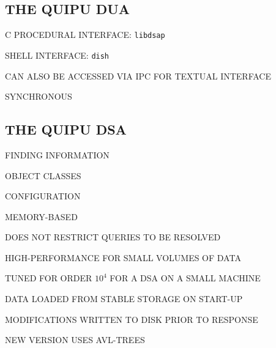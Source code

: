 \begin{bwslide}
\part*	{THE QUIPU DUA}\bf

\begin{nrtc}
\item	C PROCEDURAL INTERFACE: \verb"libdsap"

\item	SHELL INTERFACE: \verb"dish"
    \begin{nrtc}
    \item	CAN ALSO BE ACCESSED VIA IPC FOR TEXTUAL INTERFACE
    \end{nrtc}

\item	SYNCHRONOUS
\end{nrtc}
\end{bwslide}




\begin{bwslide}
\part	{THE QUIPU DSA}\bf

\begin{nrtc}
\item	FINDING INFORMATION

\item	OBJECT CLASSES

\item	CONFIGURATION
\end{nrtc}
\end{bwslide}


\begin{bwslide}

\begin{nrtc}
\item	MEMORY-BASED
    \begin{nrtc}
    \item	DOES NOT RESTRICT QUERIES TO BE RESOLVED

    \item	HIGH-PERFORMANCE FOR SMALL VOLUMES OF DATA

    \item	TUNED FOR ORDER $10^4$ FOR A DSA ON A SMALL MACHINE
    \end{nrtc}

\item	DATA LOADED FROM STABLE STORAGE ON START-UP

\item	MODIFICATIONS WRITTEN TO DISK PRIOR TO RESPONSE

\item	NEW VERSION USES AVL-TREES
\end{nrtc}
\end{bwslide}


